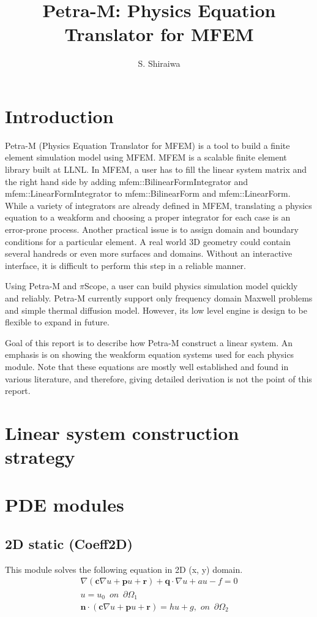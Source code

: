 \documentclass[11pt,a4paper,draft]{report}
\author{S. Shiraiwa}
\title{Petra-M: Physics Equation Translator for MFEM}
\begin{document}
\maketitle
\chapter{Introduction}
Petra-M (Physics Equation Translator for MFEM) is a tool to build a finite element simulation model using MFEM. 
MFEM is a scalable finite element library built at LLNL. In MFEM,  a user has to fill the linear system matrix and the right hand side by adding  mfem::BilinearFormIntegrator and mfem::LinearFormIntegrator to mfem::BilinearForm and mfem::LinearForm.
While a variety of integrators are already defined in MFEM, translating a physics equation to a weakform and choosing a proper integrator for each case is an error-prone process. 
Another practical issue is to assign domain and boundary conditions for a particular element. A real world 3D geometry could contain several handreds or even more surfaces and domains. Without an interactive interface, it is difficult to perform this step in a reliable manner.

Using Petra-M and $\pi$Scope, a user can build physics simulation model quickly and reliably. Petra-M currently support only frequency domain Maxwell problems and simple thermal diffusion model. However, its low level engine is design to be flexible to expand in future.

Goal of this report is to describe how Petra-M construct a linear system. An emphasis is on showing the weakform equation systems used for each physics module. Note that these equations are mostly well established and found in various literature, and therefore, giving detailed derivation is not the point of this report. 

 
\chapter{Linear system construction strategy}
\chapter{PDE modules}
\section{2D static (Coeff2D)}
This module solves the following equation in 2D (x, y) domain.
  \begin{align}
   \nabla (\mathbf{c} \nabla u + \mathbf{p}u + \mathbf{r}) + \mathbf{q} \cdot \nabla u + au - f = 0 
  \\  
  u = u_{0} \,\,\,on\,\,\,\partial \Omega_{1}
  \\
 \mathbf{n}\cdot (\mathbf{c} \nabla u + \mathbf{p}u + \mathbf{r}) = hu + g,\,\,on\,\,\,\partial \Omega_{2}
  \end{align}
  
\end{document}
